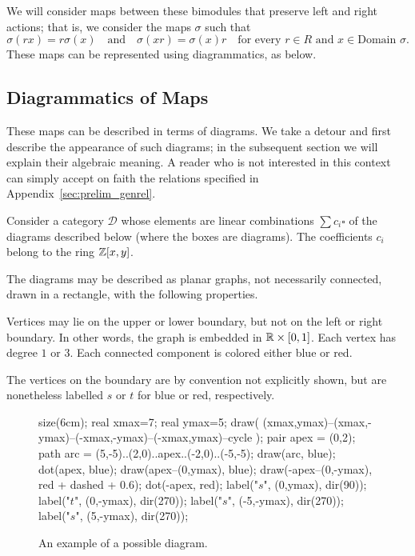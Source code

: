 We will consider maps between these bimodules that preserve left and right actions; that is, we consider the maps $\sigma$ such that
\begin{equation}
	\sigma(rx) = r\sigma(x) \quad\text{and}\quad \sigma(xr) = \sigma(x)r \quad\text{for every $r \in R$ and $x \in \text{Domain } \sigma$}.
	\label{eq:respect}
\end{equation}
These maps can be represented using diagrammatics, as below.

\subsection{Diagrammatics of Maps}
\label{sec:prelim_map}
\newcommand{\DD}{\mathcal D}
These maps can be described in terms of diagrams.  We take a detour and first describe the appearance of such diagrams; in the subsequent section we will explain their algebraic meaning.  A reader who is not interested in this context can simply accept on faith the relations specified in Appendix~\ref{sec:prelim_genrel}.

Consider a category $\DD$ whose elements are linear combinations $\sum c_i \square$ of the diagrams described below (where the boxes are diagrams).  The coefficients $c_i$ belong to the ring $\mathbb Z[x,y]$.

The diagrams may be described as planar graphs, not necessarily connected, drawn in a rectangle, with the following properties.
\begin{enumerate}[(i)]
	\ii Vertices may lie on the upper or lower boundary, but not on the left or right boundary.  In other words, the graph is embedded in $\mathbb R \times [0,1]$.
	\ii Each vertex has degree $1$ or $3$.
	\ii Each connected component is colored either blue or red.
\end{enumerate}
The vertices on the boundary are by convention not explicitly shown, but are nonetheless labelled $s$ or $t$ for blue or red, respectively.

\begin{figure}[ht]
	\centering
	\begin{asy}
	size(6cm);
	real xmax=7;
	real ymax=5;
	draw( (xmax,ymax)--(xmax,-ymax)--(-xmax,-ymax)--(-xmax,ymax)--cycle );
	pair apex = (0,2);
	path arc = (5,-5)..(2,0)..apex..(-2,0)..(-5,-5);
	draw(arc, blue);
	dot(apex, blue);
	draw(apex--(0,ymax), blue);
	draw(-apex--(0,-ymax), red + dashed + 0.6);
	dot(-apex, red);
	label("$s$", (0,ymax), dir(90));
	label("$t$", (0,-ymax), dir(270));
	label("$s$", (-5,-ymax), dir(270));
	label("$s$", (5,-ymax), dir(270));
	\end{asy}
	\caption{An example of a possible diagram.}
	\label{fig:example_diagram}
\end{figure}

